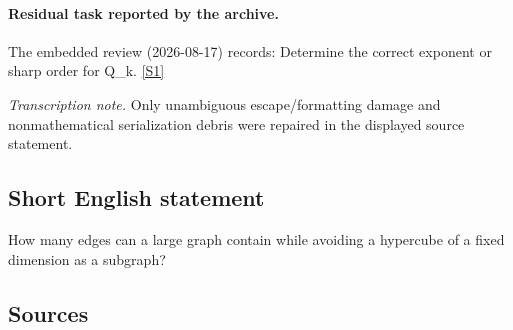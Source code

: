 \documentclass[11pt,a4paper]{article}
\newcommand{\sref}[2]{\hyperlink{source:#1:#2}{[S#2]}}
\begin{document}
\paragraph{Residual task reported by the archive.}

The embedded review (2026-08-17) records: Determine the correct exponent or sharp order for Q\_k. \sref{2191}{1}

{\small\emph{Transcription note.} Only unambiguous escape/formatting damage and nonmathematical serialization debris were repaired in the displayed source statement.}

\subsection{Short English statement}

How many edges can a large graph contain while avoiding a hypercube of a fixed dimension as a subgraph?

\subsection{Sources}
\end{document}
